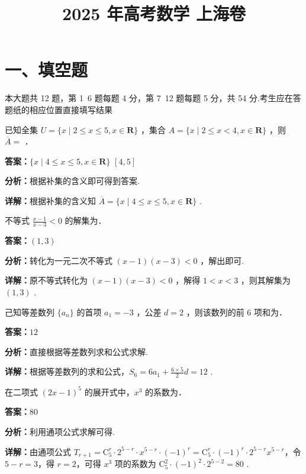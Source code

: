 ﻿\title{2025 年高考数学 上海卷}
\date{}
\maketitle

\section*{一、填空题}
本大题共 12 题，第 1~6 题每题 4 分，第 7~12 题每题 5 分，共 54 分.考生应在答题纸的相应位置直接填写结果

\begin{question}[points=4]
已知全集 $U = \{x \mid 2 \leq x \leq 5, x \in \mathbf{R}\}$ ，集合 $A = \{x \mid 2 \leq x < 4, x \in \mathbf{R}\}$ ，则 $\overline{A} =$ ．
\begin{solution}
\textbf{答案：}$\{x \mid 4 \leq x \leq 5, x \in \mathbf{R}\}$  $[4,5]$

\textbf{分析：}根据补集的含义即可得到答案.

\textbf{详解：}根据补集的含义知 $\overline{A} = \{x \mid 4 \leq x \leq 5, x \in \mathbf{R}\}$ .
\end{solution}
\end{question}

\begin{question}[points=4]
不等式 $\frac{x-1}{x-3} < 0$ 的解集为．
\fillin[{$(1,3)$}]
\begin{solution}
\textbf{答案：}$(1,3)$

\textbf{分析：}转化为一元二次不等式 $(x-1)(x-3) < 0$ ，解出即可.

\textbf{详解：}原不等式转化为 $(x-1)(x-3) < 0$ ，解得 $1 < x < 3$ ，则其解集为 $(1,3)$ .
\end{solution}
\end{question}

\begin{question}[points=4]
己知等差数列 $\{a_n\}$ 的首项 $a_1 = -3$ ，公差 $d = 2$ ，则该数列的前 $6$ 项和为．
\fillin[{$12$}]
\begin{solution}
\textbf{答案：}$12$

\textbf{分析：}直接根据等差数列求和公式求解.

\textbf{详解：}根据等差数列的求和公式，$S_6 = 6a_1 + \frac{6 \times 5}{2} d = 12$ .
\end{solution}
\end{question}

\begin{question}[points=4]
在二项式 $(2x-1)^5$ 的展开式中，$x^3$ 的系数为．
\fillin[{$80$}]
\begin{solution}
\textbf{答案：}$80$

\textbf{分析：}利用通项公式求解可得.

\textbf{详解：}由通项公式 $T_{r+1} = \mathrm{C}_5^r \cdot 2^{5-r} \cdot x^{5-r} \cdot (-1)^r = \mathrm{C}_5^r \cdot (-1)^r \cdot 2^{5-r} x^{5-r}$，令 $5-r=3$，得 $r=2$，可得 $x^3$ 项的系数为 $\mathrm{C}_5^2 \cdot (-1)^2 \cdot 2^{5-2} = 80$ .
\end{solution}
\end{question}

